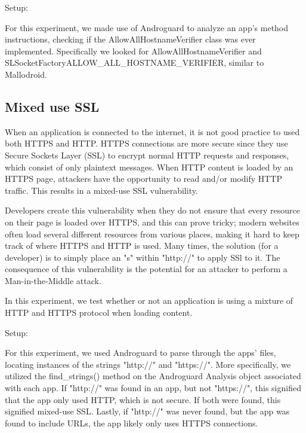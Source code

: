         Setup:

        For this experiment, we made use of Androguard to analyze an app's 
        method instructions, checking if the AllowAllHostnameVerifier class 
        was ever implemented. Specifically we looked for AllowAllHostnameVerifier and 
        SLSocketFactory\;\-\>ALLOW\_ALL\_HOSTNAME\_VERIFIER, similar to Mallodroid.


    \subsection{Mixed use SSL}

        When an application is connected to the internet, it is not 
        good practice to used both HTTPS and HTTP. HTTPS connections 
        are more secure since they use Secure Sockets Layer (SSL) to 
        encrypt normal HTTP requests and responses, which consist of 
        only plaintext messages. When HTTP content is loaded by an 
        HTTPS page, attackers have the opportunity to read and/or modify
        HTTP traffic. This results in a mixed-use SSL vulnerability.

        Developers create this vulnerability when they do not ensure 
        that every resource on their page is loaded over HTTPS, and 
        this can prove tricky; modern websites often load several 
        different resources from various places, making it hard to 
        keep track of where HTTPS and HTTP is used. Many times, the 
        solution (for a developer) is to simply place an "s" within 
        "http://" to apply SSl to it. The consequence of this vulnerability 
        is the potential for an attacker to perform a Man-in-the-Middle 
        attack.

        In this experiment, we test whether or not an application is 
        using a mixture of HTTP and HTTPS protocol when loading content.

        Setup:

        For this experiment, we used Androguard to parse through the apps' 
        files, locating instances of the strings "http://" and "https://". 
        More specifically, we utilized the find\_strings() method on the Androguard 
        Analysis object associated with each app. If "http://" was found in an app, but not "https://", this signified 
        that the app only used HTTP, which is not secure. If both were found, 
        this signified mixed-use SSL. Lastly, if "http://" was never found, but 
        the app was found to include URLs, the app likely only uses 
        HTTPS connections.

